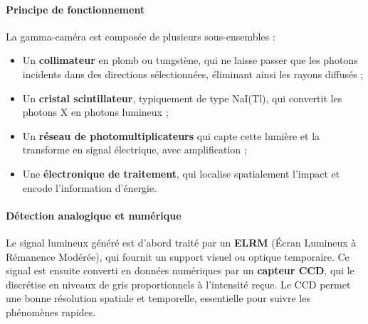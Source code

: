\documentclass[12pt,a4paper]{report}
\begin{document}
\paragraph{Principe de fonctionnement} La gamma-caméra est composée de plusieurs sous-ensembles :
\begin{itemize}
\item Un \textbf{collimateur} en plomb ou tungstène, qui ne laisse passer que les photons incidents dans des directions sélectionnées, éliminant ainsi les rayons diffusés ;
\item Un \textbf{cristal scintillateur}, typiquement de type NaI(Tl), qui convertit les photons X en photons lumineux ;
\item Un \textbf{réseau de photomultiplicateurs} qui capte cette lumière et la transforme en signal électrique, avec amplification ;
\item Une \textbf{électronique de traitement}, qui localise spatialement l’impact et encode l’information d’énergie.
\end{itemize}

\paragraph{Détection analogique et numérique}
Le signal lumineux généré est d’abord traité par un \textbf{ELRM} (Écran Lumineux à Rémanence Modérée), qui fournit un support visuel ou optique temporaire. Ce signal est ensuite converti en données numériques par un \textbf{capteur CCD}, qui le discrétise en niveaux de gris proportionnels à l’intensité reçue. Le CCD permet une bonne résolution spatiale et temporelle, essentielle pour suivre les phénomènes rapides.
\end{document}
